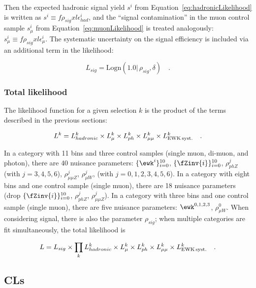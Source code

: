 Then the expected hadronic signal yield $s^i$ from
Equation~\ref{eq:hadronicLikelihood} is written as $s^i \equiv
f\rho_{sig} xl\epsilon_{had}^i$, and the ``signal contamination'' in
the muon control sample $s_{\mu}^i$ from
Equation~\ref{eq:muonLikelihood} is treated analogously: $s_{\mu}^i
\equiv f\rho_{sig} xl\epsilon_{\mu}^i$.  The systematic uncertainty on
the signal efficiency is included via an additional term in the
likelihood:

\begin{equation}
L_{sig}=\mathrm{Logn}(1.0 |\,\rho_{sig}, \delta) \quad .
\end{equation}

\subsubsection{Total likelihood}
\label{sec:totalLikelihood}

The likelihood function for a given selection $k$ is the product of
the terms described in the previous sections:

\begin{equation}
L^k = L_{hadronic}^k \times L_{\mu}^k \times L_{ph}^k \times
L_{\mu\mu}^k\times L_{\rm EWK\, syst.}^k \quad .
\end{equation}

In a category with 11 \HT bins and three control samples (single muon,
di-muon, and photon), there are 40 nuisance parameters:
$\{\ewk^{i}\}_{i=0}^{10}$, $\{\fZinv{i}\}_{i=0}^{10}$, $\rho_{phZ}^j$
(with $j=3,4,5,6$), $\rho_{\mu\mu Z}^j$, $\rho_{\mu W}^j$, (with
$j=0,1,2,3,4,5,6$).  In a category with eight \HT bins and one control
sample (single muon), there are 18 nuisance parameters (drop
$\{\fZinv{i}\}_{i=0}^{10}$, $\rho_{phZ}^j$, $\rho_{\mu\mu Z}^j$).  In
a category with three \HT bins and one control sample (single muon),
there are five nuisance parameters: $\ewk^{0,1,2,3}$, $\rho_{\mu
  W}^0$.  When considering signal, there is also the parameter
$\rho_{sig}$; when multiple categories are fit simultaneously, the
total likelihood is


\begin{equation}
L = L_{sig}\times \prod_k L_{hadronic}^k
\times L_{\mu}^k \times L_{ph}^k \times L_{\mu\mu}^k \times L_{\rm EWK\, syst.}^k \quad .
\end{equation}



\subsection{CLs\label{sec:cls}}
